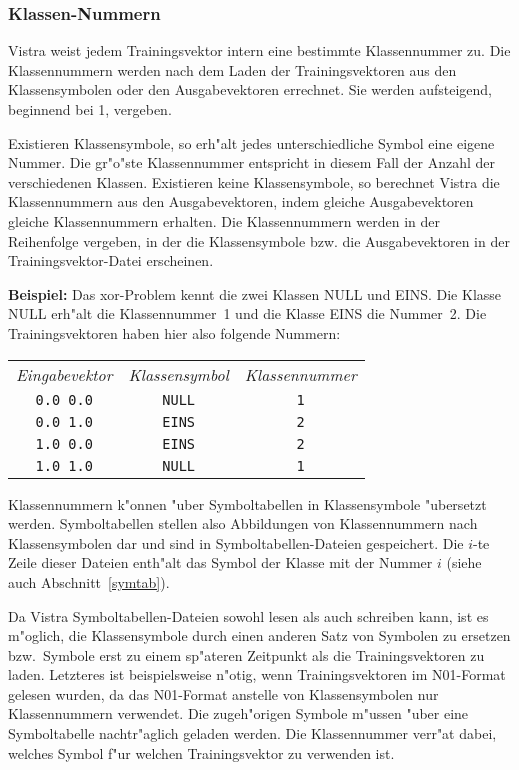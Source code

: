 \subsubsection*{Klassen-Nummern}

Vistra weist jedem Trainingsvektor intern eine bestimmte Klassennummer zu.
Die Klassennummern werden nach dem Laden der Trainingsvektoren aus
den Klassensymbolen oder den Ausgabevektoren errechnet.
Sie werden aufsteigend, beginnend bei 1, vergeben. 

Existieren Klassensymbole, so erh"alt jedes unterschiedliche Symbol
eine eigene Nummer.
Die gr"o"ste Klassennummer entspricht in diesem Fall der Anzahl der
verschiedenen Klassen.
Existieren keine Klassensymbole, so berechnet Vistra die Klassennummern
aus den Ausgabevektoren, indem gleiche Ausgabevektoren gleiche
Klassennummern erhalten.
Die Klassennummern werden in der Reihenfolge vergeben, in der die Klassensymbole
bzw. die Ausgabevektoren in der Trainingsvektor-Datei erscheinen.
  
{\bf Beispiel:} Das xor-Problem kennt die zwei Klassen NULL und EINS.
Die Klasse NULL erh"alt die Klassennummer~1 und die Klasse EINS die Nummer~2.
Die Trainingsvektoren haben hier also folgende Nummern:

\begin{tabular}{ccc}
{\it Eingabevektor} & {\it Klassensymbol} & {\it Klassennummer} \\[1ex]
{\tt 0.0 0.0} & {\tt NULL} & {\tt 1} \\
{\tt 0.0 1.0} & {\tt EINS} & {\tt 2} \\
{\tt 1.0 0.0} & {\tt EINS} & {\tt 2} \\
{\tt 1.0 1.0} & {\tt NULL} & {\tt 1}  
\end{tabular}

Klassennummern k"onnen "uber Symboltabellen in Klassensymbole "ubersetzt
werden.
Symboltabellen stellen also Abbildungen von Klassennummern nach
Klassensymbolen dar und sind in Symboltabellen-Dateien gespeichert. 
Die $i$-te Zeile dieser Dateien enth"alt das Symbol der Klasse 
mit der Nummer $i$ (siehe auch Abschnitt~\ref{symtab}).

Da Vistra Symboltabellen-Dateien sowohl lesen als auch schreiben kann,
ist es m"oglich, die Klassensymbole durch einen 
anderen Satz von Symbolen zu ersetzen bzw.~Symbole erst zu einem 
sp"ateren Zeitpunkt als die Trainingsvektoren zu laden.
Letzteres ist beispielsweise n"otig, wenn Trainingsvektoren im 
N01-Format gelesen wurden, da das N01-Format anstelle von Klassensymbolen
nur Klassennummern verwendet.
Die zugeh"origen Symbole m"ussen "uber eine Symboltabelle nachtr"aglich
geladen werden.
Die Klassennummer verr"at dabei, welches Symbol f"ur welchen Trainingsvektor
zu verwenden ist.

